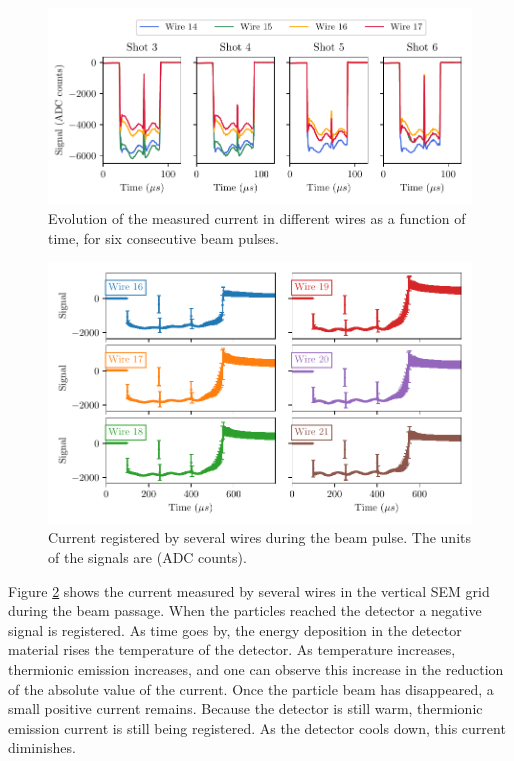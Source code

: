 \begin{figure}[h]
    \centering
    \includegraphics[width=1.0\columnwidth]{Figure_WiresGluing/WireWithTime.pdf}
    \caption{Evolution of the measured current in different wires as a function of time, for six consecutive beam pulses. }
    \label{fig:WireGlued}
\end{figure}
\begin{figure}[h!]
    \centering
    \includegraphics[width=1.0\columnwidth]{Figure_ThermionicMeasurements/VerticalThermoCurrent.pdf}
    \caption{Current registered by several wires during the beam pulse. The units of the signals are (ADC counts).}
    \label{fig:MeasuredThermo}
\end{figure}

Figure \ref{fig:MeasuredThermo} shows the current measured by several wires in the vertical SEM grid during the beam passage. When the particles reached the detector a negative signal is registered. As time goes by, the energy deposition in the detector material rises the temperature of the detector. As temperature increases, thermionic emission increases, and one can observe this increase in the reduction of the absolute value of the current. Once the particle beam has disappeared, a small positive current remains. Because the detector is still warm, thermionic emission current is still being registered.  As the detector cools down, this current diminishes. 


